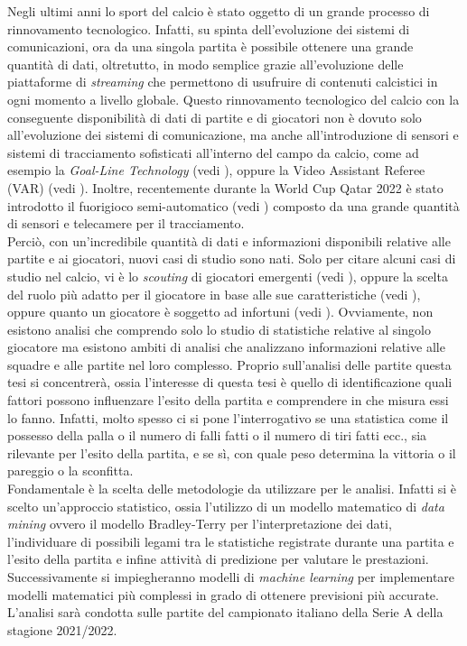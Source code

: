 Negli ultimi anni lo sport del calcio è stato oggetto di un grande processo di rinnovamento tecnologico. Infatti, su spinta dell'evoluzione dei sistemi di comunicazioni, ora da una singola partita è possibile ottenere una grande quantità di dati, oltretutto, in modo semplice grazie all'evoluzione delle piattaforme di \emph{streaming} che permettono di usufruire di contenuti calcistici in ogni momento a livello globale. Questo rinnovamento tecnologico del calcio con la conseguente disponibilità di dati di partite e di giocatori non è dovuto solo all'evoluzione dei sistemi di comunicazione, ma anche all'introduzione di sensori e sistemi di tracciamento sofisticati all'interno del campo da calcio, come ad esempio la \emph{Goal-Line Technology} (vedi \textit{\cite{glt}}), oppure la Video Assistant Referee (VAR) (vedi \textit{\cite{var}}). Inoltre, recentemente durante la World Cup Qatar 2022 è stato introdotto il fuorigioco semi-automatico (vedi \textit{\cite{offside}}) composto da una grande quantità di sensori e telecamere per il tracciamento. \\
Perciò, con un'incredibile quantità di dati e informazioni disponibili relative alle partite e ai giocatori, nuovi casi di studio sono nati. Solo per citare alcuni casi di studio nel calcio, vi è lo \textit{scouting} di giocatori emergenti (vedi \autocite{vilela2018towards}), oppure la scelta del ruolo più adatto per il giocatore in base alle sue caratteristiche (vedi \autocite{razali2017predicting}), oppure quanto un giocatore è soggetto ad infortuni (vedi \autocite{theron2020use}). Ovviamente, non esistono analisi che comprendo solo lo studio di statistiche relative al singolo giocatore ma esistono ambiti di analisi che analizzano informazioni relative alle squadre e alle partite nel loro complesso. Proprio sull'analisi delle partite questa tesi si concentrerà, ossia l'interesse di questa tesi è quello di identificazione quali fattori possono influenzare l'esito della partita e comprendere in che misura essi lo fanno. Infatti, molto spesso ci si pone l'interrogativo se una statistica come il possesso della palla o il numero di falli fatti o il numero di tiri fatti ecc., sia rilevante per l'esito della partita, e se sì, con quale peso determina la vittoria o il pareggio o la sconfitta.\\
Fondamentale è la scelta delle metodologie da utilizzare per le analisi. Infatti si è scelto un'approccio statistico, ossia l'utilizzo di un modello matematico di \emph{data mining} ovvero il modello Bradley-Terry \autocite{bradley1952rank} per l'interpretazione dei dati, l'individuare di possibili legami tra le statistiche registrate durante una partita e l'esito della partita e infine attività di predizione per valutare le prestazioni. Successivamente si impiegheranno modelli di \emph{machine learning} per implementare modelli matematici più complessi in grado di ottenere previsioni più accurate. L'analisi sarà condotta sulle partite del campionato italiano della Serie A della stagione 2021/2022.
